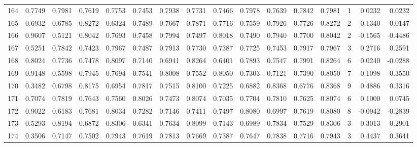 \begin{tabular}{lrrrrrrrrrrrrrrr}
164 &      0.7749 &  0.7981 &  0.7619 &  0.7753 &  0.7453 &  0.7938 &  0.7731 &  0.7466 &  0.7978 &  0.7639 &   0.7842 &     0.7981 &      1 &                    0.0232 &                     0.0232 \\
165 &      0.6932 &  0.6785 &  0.8272 &  0.6324 &  0.7489 &  0.7667 &  0.7871 &  0.7716 &  0.7559 &  0.7926 &   0.7726 &     0.8272 &      2 &                    0.1340 &                    -0.0147 \\
166 &      0.9607 &  0.5121 &  0.8042 &  0.7693 &  0.7458 &  0.7994 &  0.7497 &  0.8018 &  0.7490 &  0.7940 &   0.7700 &     0.8042 &      2 &                   -0.1565 &                    -0.4486 \\
167 &      0.5251 &  0.7842 &  0.7423 &  0.7967 &  0.7487 &  0.7913 &  0.7730 &  0.7387 &  0.7725 &  0.7453 &   0.7917 &     0.7967 &      3 &                    0.2716 &                     0.2591 \\
168 &      0.8024 &  0.7736 &  0.7478 &  0.8097 &  0.7140 &  0.6941 &  0.8264 &  0.6401 &  0.7893 &  0.7547 &   0.7991 &     0.8264 &      6 &                    0.0240 &                    -0.0288 \\
169 &      0.9148 &  0.5598 &  0.7945 &  0.7694 &  0.7541 &  0.8008 &  0.7552 &  0.8050 &  0.7303 &  0.7121 &   0.7390 &     0.8050 &      7 &                   -0.1098 &                    -0.3550 \\
170 &      0.3482 &  0.6798 &  0.8175 &  0.6954 &  0.7817 &  0.7515 &  0.8100 &  0.7225 &  0.6882 &  0.8368 &   0.6776 &     0.8368 &      9 &                    0.4886 &                     0.3316 \\
171 &      0.7074 &  0.7819 &  0.7643 &  0.7560 &  0.8026 &  0.7473 &  0.8074 &  0.7035 &  0.7704 &  0.7810 &   0.7625 &     0.8074 &      6 &                    0.1000 &                     0.0745 \\
172 &      0.9022 &  0.6183 &  0.7681 &  0.8034 &  0.7282 &  0.7146 &  0.7411 &  0.7497 &  0.8080 &  0.6997 &   0.7619 &     0.8080 &      8 &                   -0.0942 &                    -0.2839 \\
173 &      0.5293 &  0.8194 &  0.6872 &  0.8306 &  0.6341 &  0.7634 &  0.8099 &  0.7143 &  0.6989 &  0.7834 &   0.7529 &     0.8306 &      3 &                    0.3013 &                     0.2901 \\
174 &      0.3506 &  0.7147 &  0.7502 &  0.7943 &  0.7619 &  0.7813 &  0.7669 &  0.7387 &  0.7647 &  0.7838 &   0.7716 &     0.7943 &      3 &                    0.4437 &                     0.3641 \\

\end{tabular}
